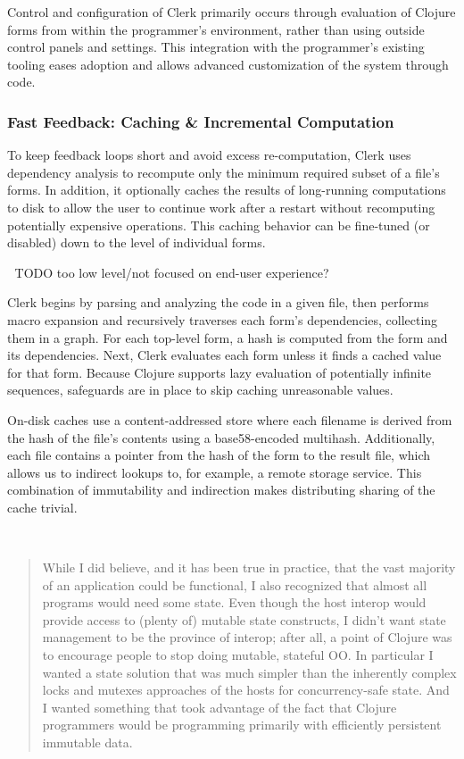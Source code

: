 \documentclass[
]{article}
\begin{document}
Control and configuration of Clerk primarily occurs through evaluation of Clojure forms from within the programmer's environment, rather than using outside control panels and settings. This integration with the programmer's existing tooling eases adoption and allows advanced customization of the system through code.

\hypertarget{id}{%
\subsubsection{Fast Feedback: Caching \& Incremental Computation}\label{id}}

To keep feedback loops short and avoid excess re-computation, Clerk uses dependency analysis to recompute only the minimum required subset of a file's forms. In addition, it optionally caches the results of long-running computations to disk to allow the user to continue work after a restart without recomputing potentially expensive operations. This caching behavior can be fine-tuned (or disabled) down to the level of individual forms.

🚧 TODO too low level/not focused on end-user experience? 🤔

Clerk begins by parsing and analyzing the code in a given file, then performs macro expansion and recursively traverses each form's dependencies, collecting them in a graph. For each top-level form, a hash is computed from the form and its dependencies. Next, Clerk evaluates each form unless it finds a cached value for that form. Because Clojure supports lazy evaluation of potentially infinite sequences, safeguards are in place to skip caching unreasonable values.

On-disk caches use a content-addressed store where each filename is derived from the hash of the file's contents using a base58-encoded multihash. Additionally, each file contains a pointer from the hash of the form to the result file, which allows us to indirect lookups to, for example, a remote storage service. This combination of immutability and indirection makes distributing sharing of the cache trivial.

🚧

\begin{quote}
While I did believe, and it has been true in practice, that the vast majority of an application could be functional, I also recognized that almost all programs would need some state. Even though the host interop would provide access to (plenty of) mutable state constructs, I didn't want state management to be the province of interop; after all, a point of Clojure was to encourage people to stop doing mutable, stateful OO. In particular I wanted a state solution that was much simpler than the inherently complex locks and mutexes approaches of the hosts for concurrency-safe state. And I wanted something that took advantage of the fact that Clojure programmers would be programming primarily with efficiently persistent immutable data.
\end{quote}
\end{document}
